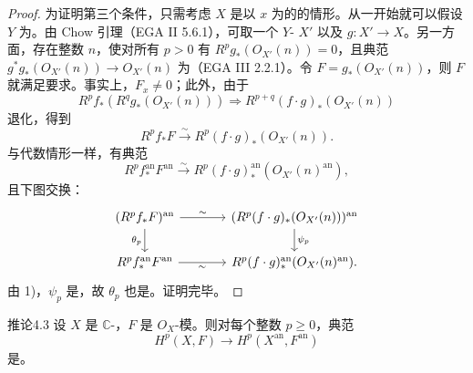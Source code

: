 \begin{proof}
为证明第三个条件，只需考虑 $X$ 是以 $x$ 为的的情形。从一开始就可以假设 $Y$ 为。由 Chow 引理（EGA II 5.6.1），可取一个 $Y$- $X'$ 以及 $g:X'\to X$。另一方面，存在整数 $n$，使对所有 $p>0$ 有 $R^pg_*(O_{X'}(n))=0$，且典范 $g^*g_*(O_{X'}(n))\to O_{X'}(n)$ 为（EGA III 2.2.1）。令 $F=g_*(O_{X'}(n))$，则 $F$ 就满足要求。事实上，$F_x\ne0$；此外，由于 
\[
R^pf_*(R^qg_*(O_{X'}(n)))\Longrightarrow R^{p+q}(f\cdot g)_*(O_{X'}(n))
\]
退化，得到
\[
R^pf_*F\xrightarrow{\sim}R^p(f\cdot g)_*(O_{X'}(n)).
\]
与代数情形一样，有典范
\[
R^pf_*^{\mathrm{an}}F^{\mathrm{an}}\xrightarrow{\sim}
R^p(f\cdot g)_*^{\mathrm{an}}(O_{X'}(n)^{\mathrm{an}}),
\]
且下图交换：
\[
\begin{tikzcd}[column sep=large]
(R^pf_*F)^{\mathrm{an}}\arrow[r,"\sim"]\arrow[d,"\theta_p"']&
(R^p(f\cdot g)_*(O_{X'}(n)))^{\mathrm{an}}\arrow[d,"\psi_p"]\\
R^pf_*^{\mathrm{an}}F^{\mathrm{an}}\arrow[r,"\sim"']&
R^p(f\cdot g)_*^{\mathrm{an}}(O_{X'}(n)^{\mathrm{an}}).
\end{tikzcd}
\]
由 1)，$\psi_p$ 是，故 $\theta_p$ 也是。证明完毕。
\end{proof}

\begin{SGAresult}{推论}{4.3}
设 $X$ 是 $\mathbb C$-，$F$ 是 $O_X$-模。则对每个整数 $p\geq0$，典范
\[
H^p(X,F)\longrightarrow H^p(X^{\mathrm{an}},F^{\mathrm{an}})
\]
是。
\end{SGAresult}

